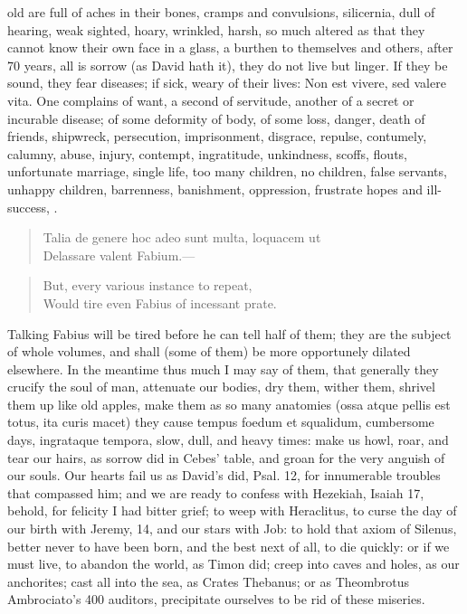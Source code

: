 {{old are full of aches in their bones, cramps and convulsions,
silicernia, dull of hearing, weak sighted, hoary, wrinkled, harsh, so
much altered as that they cannot know their own face in a glass, a
burthen to themselves and others, after 70 years, all is sorrow (as
David hath it), they do not live but linger. If they be sound, they
fear diseases; if sick, weary of their lives: Non est vivere, sed
valere vita. One complains of want, a second of servitude,
another of a secret or incurable disease; of some deformity of
body, of some loss, danger, death of friends, shipwreck, persecution,
imprisonment, disgrace, repulse,  contumely, calumny, abuse,
injury, contempt, ingratitude, unkindness, scoffs, flouts, unfortunate
marriage, single life, too many children, no children, false servants,
unhappy children, barrenness, banishment, oppression, frustrate hopes
and ill-success, \etc{}.
%
\begin{verse}
\textlatin{Talia de genere hoc adeo sunt multa, loquacem ut}\\
\textlatin{Delassare valent Fabium}.---
\end{verse}
\translationrule
\begin{verse}
But, every various instance to repeat,\\
Would tire even Fabius of incessant prate.
\end{verse}

Talking Fabius will be tired before he can tell half of them; they are
the subject of whole volumes, and shall (some of them) be more
opportunely dilated elsewhere. In the meantime thus much I may say of
them, that generally they crucify the soul of man, attenuate our
bodies, dry them, wither them, shrivel them up like old apples, make
them as so many anatomies (ossa atque pellis est totus, ita curis
macet) they cause tempus foedum et squalidum, cumbersome days,
ingrataque tempora, slow, dull, and heavy times: make us howl, roar,
and tear our hairs, as sorrow did in Cebes' table, and groan for
the very anguish of our souls. Our hearts fail us as David's did, Psal.
 12, for innumerable troubles that compassed him; and we are ready
to confess with Hezekiah, Isaiah  17, behold, for felicity I had
bitter grief; to weep with Heraclitus, to curse the day of our birth
with Jeremy,  14, and our stars with Job: to hold that axiom of
Silenus, better never to have been born, and the best next of
all, to die quickly: or if we must live, to abandon the world, as Timon
did; creep into caves and holes, as our anchorites; cast all into the
sea, as Crates Thebanus; or as Theombrotus Ambrociato's 400 auditors,
precipitate ourselves to be rid of these miseries.

}}
